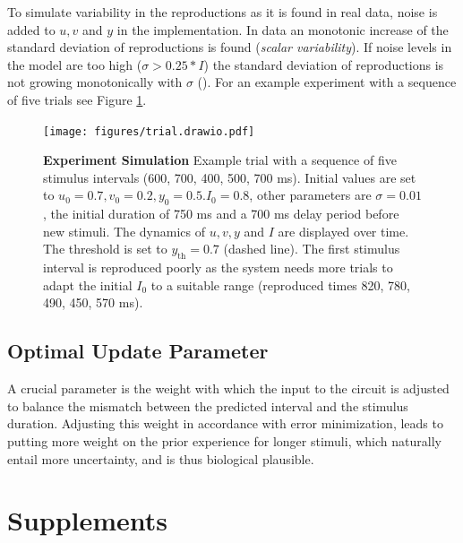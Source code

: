 \documentclass[10pt]{article}
\begin{document}
To simulate variability in the reproductions as it is found in real data, noise is added to $u, v$ and $y$ in the implementation. In data an monotonic increase of the standard deviation of reproductions is found (\textit{scalar variability}). 
If noise levels in the model are too high ($\sigma>0.25*I$) the standard deviation of reproductions is not growing monotonically with $\sigma$ (\cite{Egger2020}). 
For an example experiment with a sequence of five trials see Figure \ref{fig:experiment}. 

\begin{figure}[ht]
	\centering
	\texttt{[image: figures/trial.drawio.pdf]}
	\caption{\textbf{Experiment Simulation} Example trial with a sequence of five stimulus intervals (600, 700, 400, 500, 700 ms). Initial values are set to $u_0=0.7 , v_0=0.2 , y_0=0.5. I_0=0.8$, other parameters are $\sigma=0.01$, the initial duration of 750 ms and a 700 ms delay period before new stimuli. The dynamics of $u, v, y $ and $I$ are displayed over time. The threshold is set to $y_{\text{th}}=0.7$ (dashed line). The first stimulus interval is reproduced poorly as the system needs more trials to adapt the initial $I_0$ to a suitable range (reproduced times 820, 780, 490, 450, 570 ms).}
\label{fig:experiment}
\end{figure}

\subsection{Optimal Update Parameter}
A crucial parameter is the weight with which the input to the circuit is adjusted to balance the mismatch between the predicted interval and the stimulus duration. 
Adjusting this weight in accordance with error minimization, leads to putting more weight on the prior experience for longer stimuli, which naturally entail more uncertainty, and is thus biological plausible.


\section{Supplements}
\end{document}
